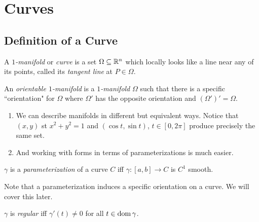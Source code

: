 \documentclass[notes.tex]{subfiles}
\begin{document}
\setcounter{section}{2}
\section{Curves}

\subsection{Definition of a Curve}
\begin{definition}[$1$-Manifold]
    A \textit{$1$-manifold} or \textit{curve} is a set $\Omega \subseteq \mathbb{R}^n$ which locally looks like a line near any of its points, called its \textit{tangent line} at $P \in \Omega$.
\end{definition}
\begin{definition}
    An \textit{orientable $1$-manifold} is a \textit{$1$-manifold} $\Omega$ such that there is a specific ``orientation" for $\Omega$ where $\Omega'$ has the opposite orientation and $(\Omega')' = \Omega$.
\end{definition}
\begin{enumerate}[label = \arabic*)]
    \item We can describe manifolds in different but equivalent ways. Notice that $(x, y)$ st $x^2 + y^2 = 1$ and $(\cos t, \sin t)$, $t \in [0, 2\pi]$ produce precisely the same set.
    \item And working with forms in terms of parameterizations is much easier.
\end{enumerate}

\begin{definition}
    $\gamma$ is a \textit{parameterization} of a curve $C$ iff $\gamma\colon [a, b] \to C$ is $C^1$ smooth.
\end{definition}
Note that a parameterization induces a specific orientation on a curve. We will cover this later.

\begin{definition}[Regularity]
    $\gamma$ is \textit{regular} iff $\gamma'(t) \neq 0$ for all $t \in \operatorname{dom} \gamma$.
\end{definition}
\end{document}
